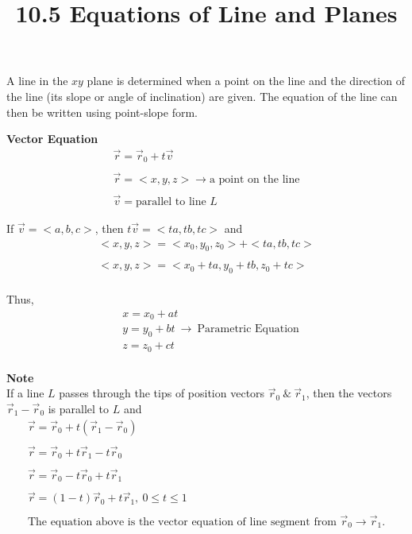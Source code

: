 \documentclass{article}
\title{10.5 Equations of Line and Planes}
\begin{document}
  \maketitle
  A line in the $ xy $ plane is determined when a point on the line and the direction of the line (its slope or angle of inclination) are given. The equation of the line can then be written using point-slope form.

  \textbf{Vector Equation}
  \[
    \begin{gathered}
    \vec{r}=\vec{r}_{0}+t\vec{v}\\
    ~\\
    \vec{r}=< x, y, z> \to \text{a point on the line}\\
    ~\\
    \vec{v}=\text{parallel to line } L 
    \end{gathered}
  \]

  If $ \vec{v}=< a, b, c>$, then $ t\vec{v}=< ta, tb, tc>$ and
 \[
   \begin{gathered}
  < x, y, z>=< x_{0}, y_{0} ,z_{0}  >+< ta, tb, tc>\\
  ~\\
  < x, y, z> =< x_{0} +ta,y_{0} +tb ,z_{0}+tc>~\\ 
   \end{gathered}
 \]

 Thus, 
 \[
   \begin{aligned}
   &x=x_{0}+at\\
   &y=y_{0}+bt~\to~\text{Parametric Equation}\\
   &z=z_{0}+ct\\ 
   \end{aligned}
 \]

  \textbf{Note}\\
  If a line $ L $ passes through the tips of position vectors $ \vec{r}_{0}  ~\&~\vec{r}_{1} $, then the vectors $ \vec{r}_{1} - \vec{r}_{0}$ is parallel to $ L $ and
  \[
    \begin{gathered}
    \vec{r}=\vec{r}_{0}+t(\vec{r}_{1} -\vec{r}_{0} )\\
    ~\\
    \vec{r}=\vec{r}_{0}+t\vec{r}_{1}-t\vec{r}_{0}\\
    ~\\
    \vec{r}=\vec{r}_{0}-t\vec{r}_{0}+t\vec{r}_{1}\\
    ~\\
    \vec{r}=(1-t)\vec{r}_{0}+t\vec{r}_{1},~0\le t \le 1\\
    ~\\
    \text{The equation above is the vector equation of line segment from } \vec{r}_{0} \to \vec{r}_{1}.  
    \end{gathered}
  \]
  
\end{document}
